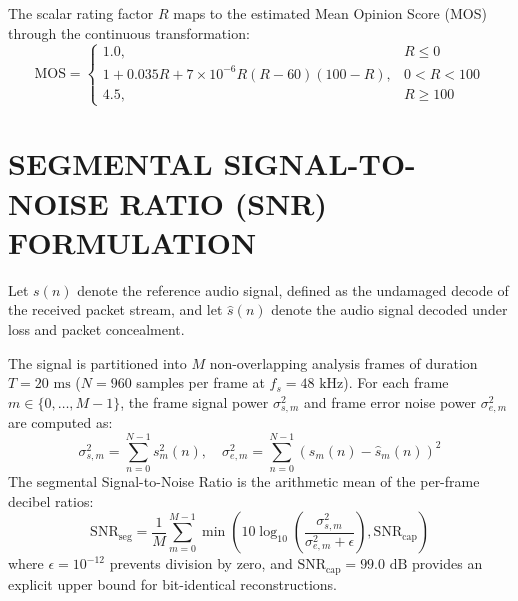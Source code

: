 The scalar rating factor $R$ maps to the estimated Mean Opinion Score (MOS) through the continuous transformation:
\begin{equation}
    \text{MOS} = 
    \begin{cases}
        1.0, & R \le 0 \\
        1 + 0.035 R + 7 \times 10^{-6} R (R - 60) (100 - R), & 0 < R < 100 \\
        4.5, & R \ge 100
    \end{cases}
\end{equation}

\section{SEGMENTAL SIGNAL-TO-NOISE RATIO (SNR) FORMULATION}
Let $s(n)$ denote the reference audio signal, defined as the undamaged decode of the received packet stream, and let $\hat{s}(n)$ denote the audio signal decoded under loss and packet concealment.

The signal is partitioned into $M$ non-overlapping analysis frames of duration $T = 20\text{ ms}$ ($N = 960$ samples per frame at $f_s = 48\text{ kHz}$). For each frame $m \in \{0, \dots, M-1\}$, the frame signal power $\sigma_{s,m}^2$ and frame error noise power $\sigma_{e,m}^2$ are computed as:
\begin{equation}
    \sigma_{s,m}^2 = \sum_{n=0}^{N-1} s_m^2(n), \quad \sigma_{e,m}^2 = \sum_{n=0}^{N-1} \left( s_m(n) - \hat{s}_m(n) \right)^2
\end{equation}
The segmental Signal-to-Noise Ratio is the arithmetic mean of the per-frame decibel ratios:
\begin{equation}
    \text{SNR}_{\text{seg}} = \frac{1}{M} \sum_{m=0}^{M-1} \min \left( 10 \log_{10} \left( \frac{\sigma_{s,m}^2}{\sigma_{e,m}^2 + \epsilon} \right), \text{SNR}_{\text{cap}} \right)
\end{equation}
where $\epsilon = 10^{-12}$ prevents division by zero, and $\text{SNR}_{\text{cap}} = 99.0\text{ dB}$ provides an explicit upper bound for bit-identical reconstructions.
